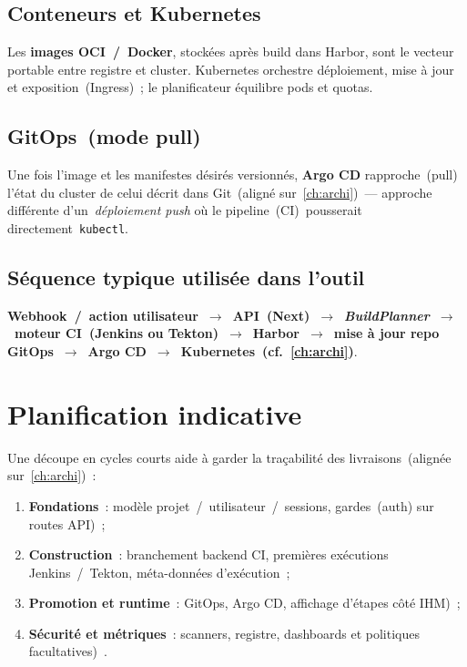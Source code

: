 \subsection{Conteneurs et Kubernetes}

Les \textbf{images OCI~/~Docker}, stockées après build dans Harbor, sont le vecteur portable entre registre et cluster. Kubernetes orchestre déploiement, mise à jour et exposition~(Ingress)~; le planificateur équilibre pods et quotas.

\subsection{GitOps~(mode pull)~}

Une fois l'image et les manifestes désirés versionnés, \textbf{Argo CD} rapproche~(pull)~ l'état du cluster de celui décrit dans Git~(aligné sur~\ref{ch:archi})~— approche différente d'un~\emph{déploiement push} où le pipeline~(CI)~pousserait directement~\texttt{kubectl}.

\subsection{Séquence typique utilisée dans l'outil}

\textbf{Webhook~/~action utilisateur~$\rightarrow$~API~(Next)~$\rightarrow$~\emph{BuildPlanner}~$\rightarrow$~moteur CI~(Jenkins ou Tekton)~$\rightarrow$~Harbor~$\rightarrow$~mise à jour repo GitOps~$\rightarrow$~Argo CD~$\rightarrow$~Kubernetes~(cf.~\ref{ch:archi})}.

\section{Planification indicative}

Une découpe en cycles courts aide à garder la traçabilité des livraisons~(alignée sur~\ref{ch:archi})~:

\begin{enumerate}[leftmargin=*]
\item \textbf{Fondations}~: modèle projet~/~utilisateur~/~sessions, gardes~(auth) sur routes API)~;
\item \textbf{Construction}~: branchement backend CI, premières exécutions Jenkins~/~Tekton, méta-données d'exécution~;
\item \textbf{Promotion et runtime}~: GitOps, Argo CD, affichage d'étapes côté IHM)~;
\item \textbf{Sécurité et métriques}~: scanners, registre, dashboards et politiques facultatives)~.
\end{enumerate}

